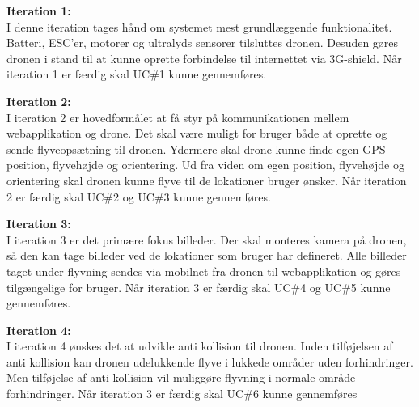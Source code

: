 \textbf{Iteration 1:} \\
I denne iteration tages hånd om systemet mest grundlæggende funktionalitet. Batteri, ESC'er, motorer og ultralyds sensorer tilsluttes dronen. Desuden gøres dronen i stand til at kunne oprette forbindelse til internettet via 3G-shield. Når iteration 1 er færdig skal UC\#1 kunne gennemføres.  

\textbf{Iteration 2:} \\
I iteration 2 er hovedformålet at få styr på kommunikationen mellem webapplikation og drone. Det skal være muligt for bruger både at oprette og sende flyveopsætning til dronen. 
Ydermere skal drone kunne finde egen GPS position, flyvehøjde og orientering. Ud fra viden om egen position, flyvehøjde og orientering skal dronen kunne flyve til de lokationer bruger ønsker. Når iteration 2 er færdig skal UC\#2 og UC\#3 kunne gennemføres.  

\textbf{Iteration 3:}  \\
I iteration 3 er det primære fokus billeder. Der skal monteres kamera på dronen, så den kan tage billeder ved de lokationer som bruger har defineret. Alle billeder taget under flyvning sendes via mobilnet fra dronen til webapplikation og gøres tilgængelige for bruger. Når iteration 3 er færdig skal UC\#4 og UC\#5 kunne gennemføres.

\textbf{Iteration 4:} \\
I iteration 4 ønskes det at udvikle anti kollision til dronen. 
Inden tilføjelsen af anti kollision kan dronen udelukkende flyve i lukkede områder uden forhindringer. Men tilføjelse af anti kollision vil muliggøre flyvning i normale område forhindringer. Når iteration 3 er færdig skal UC\#6 kunne gennemføres  